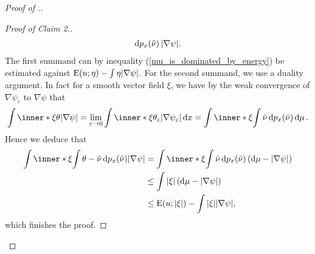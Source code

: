 \begin{proof}[Proof of .]
\begin{proof}[Proof of Claim 2.]
\begin{align*}
			\dd{ p_{ x } ( \tilde{ \nu } ) }
			\abs{ \nabla \psi }.
		\end{align*}
		The first summand can by inequality (\ref{mu_is_dominated_by_energy}) 
		be estimated against 
		$ \operatorname{E} ( u ; \eta ) - \int \eta \abs{ \nabla \psi } $.
		For the second summand, we use a duality argument.
		In fact for a smooth vector field $ \xi $, we have by the weak 
		convergence of 
		$ 
		\nabla \psi_{ \varepsilon } $ to $ \nabla \psi $ that
		\begin{equation*}
			\int
			\inner*{ \xi }{ \theta }
			\abs{ \nabla \psi }
			=
			\lim_{ \varepsilon \to 0 }
			\int
			\inner*{ \xi }{ \theta_{ \varepsilon } }
			\abs{ \nabla \psi_{ \varepsilon } }
			\dd{ x }
			=
			\int
			\inner*{ \xi }{
				\int 
				\tilde{ \nu } 
				\dd{ p_{ x } ( \tilde{ \nu } ) } 
			}
			\dd{ \mu }.
		\end{equation*}
		Hence we deduce that
		\begin{align*}
			\int
			\inner*{ \xi }{
				\int
				\theta - \tilde{ \nu }
				\dd{ p_{ x } ( \tilde{ \nu } ) }
			}
			\abs{ \nabla \psi }
			& =
			\int
			\inner*{ \xi }{
				\int
				\tilde{ \nu }
				\dd{ p_{ x } ( \tilde{ \nu } ) }
			}
			\left(
			\dd{ \mu } - \abs{ \nabla \psi }
			\right)
			\\
			& \leq
			\int
			\abs{ \xi }
			\left(
			\dd{ \mu } - \abs{ \nabla \psi }
			\right)
			\\
			& \leq
			\energy ( u ; \abs{ \xi } )
			-
			\int
			\abs{ \xi }
			\abs{ \nabla \psi },
		\end{align*}
		which finishes the proof.
	\end{proof}
	

\end{proof}
